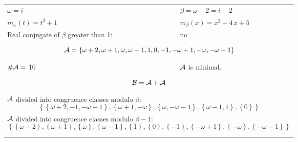 \begin{exmp}
\label{ex:compareAP}


\rule{0cm}{0cm}

\begin{tabular}{ll}
$\omega=  i $  & $\beta= \omega - 2 = i - 2 $\\
$m_\omega(t)=  t^{2} + 1 $  & $m_\beta(x)=  x^{2} + 4 \, x + 5 $\\
Real conjugate of $\beta$ greater than 1:   &  no \\ \hline
\multicolumn{2}{l}{\begin{minipage}{\textwidth}\begin{dmath*}\A = \left\{\omega + 2, \omega + 1, \omega, \omega - 1, 1, 0, -1, -\omega + 1, -\omega, -\omega - 1\right\}  \end{dmath*}\end{minipage} }\\
$\#\mathcal{A}= $ 10 $ $ & $\mathcal{A}$ is minimal. \\
\multicolumn{2}{l}{\begin{minipage}{\textwidth}\begin{dmath*}\B =\A+\A \end{dmath*}\end{minipage} }\\[10pt]
\multicolumn{2}{l}{\begin{minipage}{\textwidth}$\mathcal{A}$ divided into congruence classes modulo $\beta$: \begin{dmath*} \left\{\left\{\omega + 2, -1, -\omega + 1\right\}, \left\{\omega + 1, -\omega\right\}, \left\{\omega, -\omega - 1\right\}, \left\{\omega - 1, 1\right\}, \left\{0\right\}\right\}  \end{dmath*}\end{minipage} }\\[10pt]
\multicolumn{2}{l}{\begin{minipage}{\textwidth}$\mathcal{A}$ divided into congruence classes modulo $\beta-1$: \begin{dmath*} \left\{\left\{\omega + 2\right\}, \left\{\omega + 1\right\}, \left\{\omega\right\}, \left\{\omega - 1\right\}, \left\{1\right\}, \left\{0\right\}, \left\{-1\right\}, \left\{-\omega + 1\right\}, \left\{-\omega\right\}, \left\{-\omega - 1\right\}\right\}  \end{dmath*}\end{minipage} }\\
 & \\ \hline
 & \\
\end{tabular}


\end{exmp}
